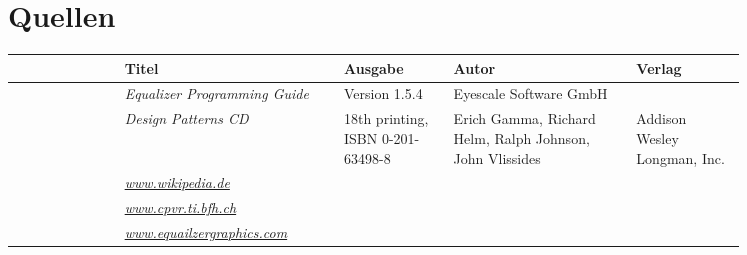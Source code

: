 \chapter{Quellen}

\begin{tabular}{|l|p{0.3\linewidth}|p{0.15\linewidth}|p{0.25\linewidth}|p{0.15\linewidth}|}
\hline  & \bfseries Titel & \bfseries Ausgabe & \bfseries Autor & \bfseries Verlag \\ \hline
\hline [1] & \textit{Equalizer Programming Guide} & Version 1.5.4 & Eyescale Software GmbH &  \\ 
\hline [2] & \textit{Design Patterns CD} & 18th printing, ISBN 0-201-63498-8 & Erich Gamma, Richard Helm, Ralph Johnson, John Vlissides & Addison Wesley Longman, Inc. \\ 
\hline [3] & \textit{\href{http://de.wikipedia.org}{www.wikipedia.de}} & & & \\ 
\hline [4] & \textit{\href{http://www.cpvr.ti.bfh.ch/wiki/vr:proj:cave:know_how:cave_overview}{www.cpvr.ti.bfh.ch}} & & & \\
\hline [5] & \textit{\href{http://www.equalizergraphics.com/api.html}{www.equailzergraphics.com}} & & & \\
\hline 
\end{tabular} 
